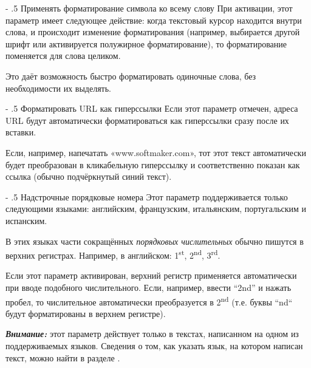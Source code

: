 ﻿\documentclass[a4paper,10pt]{article}
\makeatletter
\renewcommand\paragraph{%
   \@startsection{paragraph}{4}{0mm}%
      {-\baselineskip}%
      {.5\baselineskip}%
      {\normalfont\normalsize\bfseries}}
\makeatother
\begin{document}
 \paragraph{Применять форматирование символа ко всему слову}
 При активации, этот параметр имеет следующее действие: когда текстовый курсор находится внутри слова, и происходит изменение форматирования (например, выбирается другой шрифт или активируется полужирное форматирование), то форматирование поменяется для слова целиком.
 
 Это даёт возможность быстро форматировать одиночные слова, без необходимости их выделять.
 
 \paragraph{Форматировать URL как гиперссылки}
 Если этот параметр отмечен, адреса URL будут автоматически форматироваться как гиперссылки сразу после их вставки.
 
 Если, например, напечатать «www.softmaker.com», тот этот текст автоматически будет преобразован в кликабельную гиперссылку и соответственно показан как ссылка (обычно подчёркнутый синий текст).
 
 \paragraph{Надстрочные порядковые номера}
 Этот параметр поддерживается только следующими языками: английским, французским, итальянским, португальским и испанским.
 
 В этих языках части сокращённых \textit{порядковых числительных} обычно пишутся в верхних регистрах. Например, в английском: 1\textsuperscript{st}, 2\textsuperscript{nd}, 3\textsuperscript{rd}.
 
 Если этот параметр активирован, верхний регистр применяется автоматически при вводе подобного числительного. Если, например, ввести “2nd” и нажать пробел, то числительное автоматически преобразуется в 2\textsuperscript{nd} (т.е. буквы ``nd`` будут форматированы в верхнем регистре).
 
 \begin{mdframed}[backgroundcolor=blue!10]
\textbf{\textit{Внимание:}} этот параметр действует только в текстах, написанном на одном из поддерживаемых языков. Сведения о том, как указать язык, на котором написан текст, можно найти в разделе .
\end{mdframed}
\end{document}
